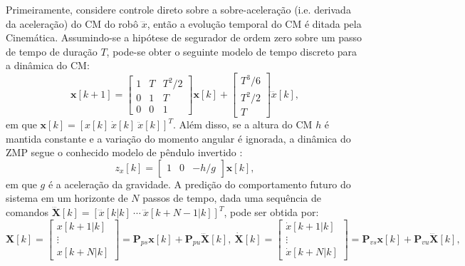 Primeiramente, considere controle direto sobre a sobre-aceleração (i.e. derivada da aceleração) do CM do robô  \( \dddot{x} \), então a evolução temporal do CM é ditada pela Cinemática. Assumindo-se a hipótese de segurador de ordem zero sobre um passo de tempo de duração \( T \), pode-se obter o seguinte modelo de tempo discreto para a dinâmica do CM:
\begin{equation}
\mathrm{\mathbf{x}}[k+1] = \begin{bmatrix}
1 & T & T^2/2 \\ 0 & 1 & T \\ 0 & 0 & 1
\end{bmatrix} \mathrm{\mathbf{x}}[k] + \begin{bmatrix}
T^3/6 \\ T^2/2 \\ T
\end{bmatrix} \dddot{x}[k],
\label{eq:discrete_dynamics_x}
\end{equation}
em que \( \mathrm{\mathbf{x}}[k] = \left[ x[k] \ \dot{x}[k] \ \ddot{x}[k] \right]^T \). Além disso, se a altura do CM \( h \) é mantida constante e a variação do momento angular é ignorada, a dinâmica do ZMP segue o conhecido modelo de pêndulo invertido \cite{kajita2001}:
\begin{equation}
z_x[k] = \begin{bmatrix}
1 & 0 & -h/g
\end{bmatrix} \mathrm{\mathbf{x}}[k],
\label{eq:zmp}
\end{equation}
em que \( g \) é a aceleração da gravidade. A predição do comportamento futuro do sistema em um horizonte de \( N \) passos de tempo, dada uma sequência de comandos \( \dddot{\mathrm{\mathbf{X}}}[k] = \left[\dddot{x}[k|k] \ \cdots \ \dddot{x}[k+N-1|k] \right]^T \), pode ser obtida por:
\begin{equation}
\mathrm{\mathbf{X}}[k] = \begin{bmatrix}
x[k+1|k] \\
\vdots \\
x[k+N|k]
\end{bmatrix} = \mathrm{\mathbf{P}}_{ps} \mathrm{\mathbf{x}}[k] + \mathrm{\mathbf{P}}_{pu} \dddot{\mathrm{\mathbf{X}}}[k], \
\dot{\mathrm{\mathbf{X}}}[k] = \begin{bmatrix}
\dot{x}[k+1|k] \\
\vdots \\
\dot{x}[k+N|k]
\end{bmatrix} = \mathrm{\mathbf{P}}_{vs} \mathrm{\mathbf{x}}[k] + \mathrm{\mathbf{P}}_{vu} \dddot{\mathrm{\mathbf{X}}}[k],
\label{eq:dx_pred}
\end{equation}
